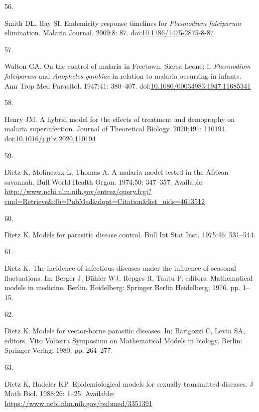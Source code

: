 \documentclass[
]{book}
\newlength{\cslhangindent}
\newlength{\csllabelwidth}
\newlength{\cslentryspacingunit} %
\newenvironment{CSLReferences}[2] %
 {%
  \setlength{\parindent}{0pt}
  \ifodd #1
  \let\oldpar\par
  \def\par{\hangindent=\cslhangindent\oldpar}
  \fi
  \setlength{\parskip}{#2\cslentryspacingunit}
 }%
 {}
\newcommand{\CSLLeftMargin}[1]{\parbox[t]{\csllabelwidth}{#1}}
\newcommand{\CSLRightInline}[1]{\parbox[t]{\linewidth - \csllabelwidth}{#1}\break}
\begin{document}
\begin{CSLReferences}{0}{0}
\leavevmode{}%
\CSLLeftMargin{56. }%
\CSLRightInline{Smith DL, Hay SI. Endemicity response timelines for \emph{{Plasmodium} falciparum} elimination. Malaria Journal. 2009;8: 87. doi:\href{https://doi.org/10.1186/1475-2875-8-87}{10.1186/1475-2875-8-87}}

\leavevmode{}%
\CSLLeftMargin{57. }%
\CSLRightInline{Walton GA. On the control of malaria in {Freetown}, {Sierra} {Leone}; {I}. \emph{{Plasmodium} falciparum} and \emph{{Anopheles} gambiae} in relation to malaria occurring in infants. Ann Trop Med Parasitol. 1947;41: 380--407. doi:\href{https://doi.org/10.1080/00034983.1947.11685341}{10.1080/00034983.1947.11685341}}

\leavevmode{}%
\CSLLeftMargin{58. }%
\CSLRightInline{Henry JM. A hybrid model for the effects of treatment and demography on malaria superinfection. Journal of Theoretical Biology. 2020;491: 110194. doi:\href{https://doi.org/10.1016/j.jtbi.2020.110194}{10.1016/j.jtbi.2020.110194}}

\leavevmode{}%
\CSLLeftMargin{59. }%
\CSLRightInline{Dietz K, Molineaux L, Thomas A. A malaria model tested in the {African} savannah. Bull World Health Organ. 1974;50: 347--357. Available: \url{http://www.ncbi.nlm.nih.gov/entrez/query.fcgi?cmd=Retrieve\&db=PubMed\&dopt=Citation\&list_uids=4613512}}

\leavevmode{}%
\CSLLeftMargin{60. }%
\CSLRightInline{Dietz K. Models for parasitic disease control. Bull Int Stat Inst. 1975;46: 531--544. }

\leavevmode{}%
\CSLLeftMargin{61. }%
\CSLRightInline{Dietz K. The incidence of infectious diseases under the influence of seasonal fluctuations. In: Berger J, Bühler WJ, Repges R, Tautu P, editors. Mathematical models in medicine. Berlin, Heidelberg: Springer Berlin Heidelberg; 1976. pp. 1--15. }

\leavevmode{}%
\CSLLeftMargin{62. }%
\CSLRightInline{Dietz K. Models for vector-borne parasitic diseases. In: Barigozzi C, Levin SA, editors. Vito {Volterra} {Symposium} on {Mathematical} {Models} in biology. Berlin: Springer-Verlag; 1980. pp. 264--277. }

\leavevmode{}%
\CSLLeftMargin{63. }%
\CSLRightInline{Dietz K, Hadeler KP. Epidemiological models for sexually transmitted diseases. J Math Biol. 1988;26: 1--25. Available: \url{https://www.ncbi.nlm.nih.gov/pubmed/3351391}}


\end{CSLReferences}
\end{document}
